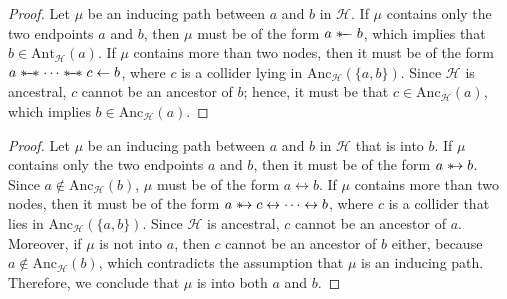 \documentclass[accepted]{uai2025} %
\newcommand{\anc}{\text{Anc}}
\newcommand{\ant}{\text{Ant}}
\newcommand{\hut}{\mathrel{\leftarrow}}
\newcommand{\huh}{\mathrel{\leftrightarrow}}
\newcommand{\suh}{\mathrel{{\ast\mkern-11mu\to}}}
\newcommand{\sut}{\mathrel{{\ast\mkern-11mu\relbar\mkern-9mu\relbar}}}
\newcommand{\sus}{\mathrel{{\ast\mkern-11mu\relbar\mkern-9mu\relbar\mkern-11mu\ast}}}
\begin{document}
\inducingPropertyTwo*
\begin{proof}
Let \( \mu \) be an inducing path between \( a \) and \( b \) in \( \mathcal{H} \). If \( \mu \) contains only the two endpoints \( a \) and \( b \), then \( \mu \) must be of the form \( a \sut b \), which implies that \( b \in \ant_{\mathcal{H}}(a) \). If \( \mu \) contains more than two nodes, then it must be of the form \( a \sus \cdots \sus c \hut b \), where \( c \) is a collider lying in \( \anc_{\mathcal{H}}(\{a,b\}) \). Since \( \mathcal{H} \) is ancestral, \( c \) cannot be an ancestor of \( b \); hence, it must be that \( c \in \anc_{\mathcal{H}}(a) \), which implies \( b \in \anc_{\mathcal{H}}(a) \).
\end{proof}






\inducingPropertyThree*
\begin{proof}
Let \( \mu \) be an inducing path between \( a \) and \( b \) in \( \mathcal{H} \) that is into \( b \). If \( \mu \) contains only the two endpoints \( a \) and \( b \), then it must be of the form \( a \suh b \). Since \( a \notin \anc_{\mathcal{H}}(b) \), \( \mu \) must be of the form \( a \huh b \). If \( \mu \) contains more than two nodes, then it must be of the form \( a \suh c \huh \cdots \huh b \), where \( c \) is a collider that lies in \( \anc_{\mathcal{H}}(\{a, b\}) \). Since \( \mathcal{H} \) is ancestral, \( c \) cannot be an ancestor of \( a \). Moreover, if \( \mu \) is not into \( a \), then \( c \) cannot be an ancestor of \( b \) either, because \( a \notin \anc_{\mathcal{H}}(b) \), which contradicts the assumption that \( \mu \) is an inducing path. Therefore, we conclude that \( \mu \) is into both \( a \) and \( b \).
\end{proof}
\end{document}
